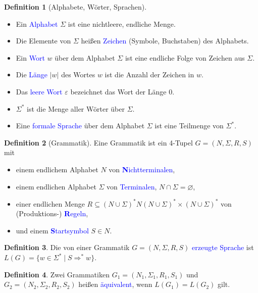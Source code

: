 \documentclass{scrreprt}
\theoremstyle{definition}
\newtheorem{Definition}{Definition}[section]
\theoremstyle{example}
\theoremstyle{algorithm}
\begin{document}
\begin{Definition}[Alphabete, Wörter, Sprachen]
\noindent
\begin{itemize}
\item
Ein \textcolor{blue}{Alphabet} $\Sigma$ ist eine nichtleere, endliche Menge.
\item
Die Elemente von $\Sigma$ heißen \textcolor{blue}{Zeichen} (Symbole, Buchstaben) des Alphabets.
\item
Ein \textcolor{blue}{Wort} $w$ über dem Alphabet $\Sigma$ ist eine endliche Folge von Zeichen aus $\Sigma$.
\item
Die \textcolor{blue}{Länge} $|w|$ des Wortes $w$ ist die Anzahl der Zeichen in $w$.
\item
Das \textcolor{blue}{leere Wort} $\varepsilon$ bezeichnet das Wort der Länge $0$.
\item
$\Sigma^*$ ist die Menge aller Wörter über $\Sigma$.
\item
Eine \textcolor{blue}{formale Sprache} über dem Alphabet $\Sigma$ ist eine Teilmenge von $\Sigma^*$.
\end{itemize}
\end{Definition}

\begin{Definition}[Grammatik]
Eine Grammatik ist ein 4-Tupel $G=(N,\Sigma,R,S)$ mit
\noindent
\begin{itemize}
\item
einem endlichem Alphabet $N$ von \textcolor{blue}{\textbf{N}ichtterminalen},
\item
einem endlichen Alphabet $\Sigma$ von \textcolor{blue}{Terminalen}, $N\cap \Sigma = \varnothing$,
\item
einer endlichen Menge $R \subseteq (N \cup \Sigma)^* N (N \cup \Sigma)^* \times (N \cup \Sigma)^*$ von (Produktions-) \textcolor{blue}{\textbf{R}egeln},
\item
und einem \textcolor{blue}{\textbf{S}tartsymbol} $S\in N$.
\end{itemize}
\end{Definition}

\begin{Definition}
Die von einer Grammatik $G=(N,\Sigma,R,S)$ \textcolor{blue}{erzeugte Sprache} ist $L(G)=\{w\in \Sigma^* \mid S \Rightarrow^* w\}$.
\end{Definition}

\begin{Definition}
Zwei Grammatiken $G_1=(N_1,\Sigma_1,R_1,S_1)$ und $G_2=(N_2,\Sigma_2,R_2,S_2)$ heißen \textcolor{blue}{äquivalent}, wenn $L(G_1)=L(G_2)$ gilt.
\end{Definition}
\end{document}
